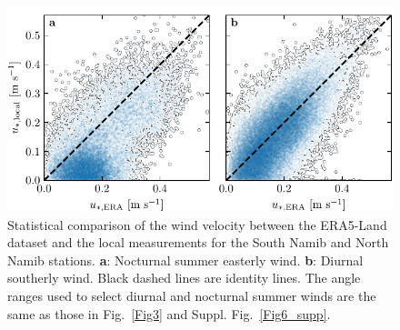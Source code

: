 \begin{figure}[p]
\centering
\includegraphics[scale=1]{Figures/Figure9_supp.pdf}
\caption{Statistical comparison of the wind velocity between the ERA5-Land dataset and the local measurements for the South Namib and North Namib stations. \textbf{a}: Nocturnal summer easterly wind. \textbf{b}: Diurnal southerly wind. Black dashed lines are identity lines. The angle ranges used to select diurnal and nocturnal summer winds are the same as those in Fig.~\ref{Fig3} and Suppl. Fig.~\ref{Fig6_supp}.}
\label{Fig9_supp}
\end{figure}

